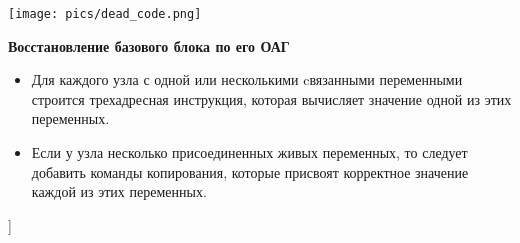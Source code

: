 \texttt{[image: pics/dead\_code.png]}

\textbf{Восстановление базового блока по его ОАГ}
\begin{itemize}
    \item Для каждого узла с одной или несколькими cвязанными переменными строится трехадресная инструкция, которая вычисляет значение одной из этих переменных.
    \item Если у узла несколько присоединенных живых переменных, то следует добавить команды копирования, которые присвоят корректное значение каждой из этих переменных.
\end{itemize}

\bigbreak
[\cite[slides 29-45]{ssg}]